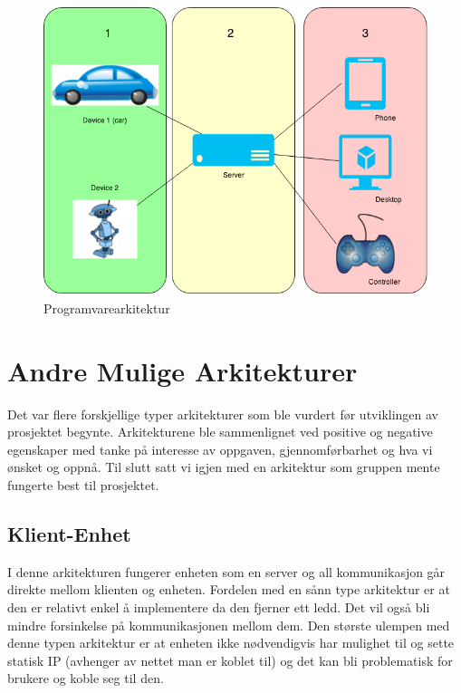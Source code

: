 \documentclass[12pt]{report}
\begin{document}
\begin{figure}[H]
	\includegraphics[scale=0.7]{imgs/Arcitechture}
	\centering
	\caption{Programvarearkitektur}
	\label{Ark}
\end{figure}

\section{Andre Mulige Arkitekturer}
Det var flere forskjellige typer arkitekturer som ble vurdert før utviklingen av prosjektet begynte. Arkitekturene ble sammenlignet ved positive og negative egenskaper med tanke på interesse av oppgaven, gjennomførbarhet og hva vi ønsket og oppnå. Til slutt satt vi igjen med en arkitektur som gruppen mente fungerte best til prosjektet.

\subsection{Klient-Enhet}
I denne arkitekturen fungerer enheten som en server og all kommunikasjon går direkte mellom klienten og enheten. Fordelen med en sånn type arkitektur er at den er relativt enkel å implementere da den fjerner ett ledd. Det vil også bli mindre forsinkelse på kommunikasjonen mellom dem. Den største ulempen med denne typen arkitektur er at enheten ikke nødvendigvis har mulighet til og sette statisk IP (avhenger av nettet man er koblet til) og det kan bli problematisk for brukere og koble seg til den.
\end{document}
